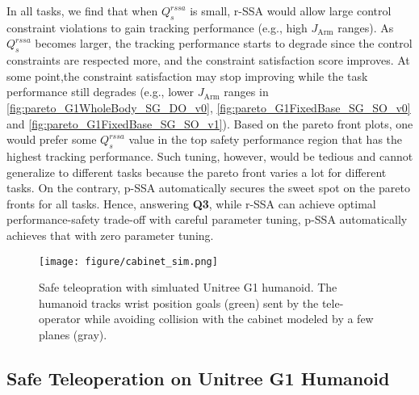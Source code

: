 In all tasks, we find that when $Q_s^{rssa}$ is small, r-SSA would allow large control constraint violations to gain tracking performance (e.g., high $J_\mathrm{Arm}$ ranges).
As $Q_s^{rssa}$ becomes larger, the tracking performance starts to degrade since the control constraints are respected more, and the constraint satisfaction score improves.
At some point,the constraint satisfaction may stop improving while the task performance still degrades (e.g., lower $J_\mathrm{Arm}$ ranges in \cref{fig:pareto_G1WholeBody_SG_DO_v0}, \cref{fig:pareto_G1FixedBase_SG_SO_v0} and \cref{fig:pareto_G1FixedBase_SG_SO_v1}).
Based on the pareto front plots, one would prefer some $Q_s^{rssa}$ value in the top safety performance region that has the highest tracking performance.
Such tuning, however, would be tedious and cannot generalize to different tasks because the pareto front varies a lot for different tasks.
On the contrary, p-SSA automatically secures the sweet spot on the pareto fronts for all tasks.
Hence, answering \textbf{Q3}, while r-SSA can achieve optimal performance-safety trade-off with careful parameter tuning, p-SSA automatically achieves that with zero parameter tuning.




\begin{figure*}[ht]
\centering
    \texttt{[image: figure/cabinet\_sim.png]}
    \caption{Safe teleopration with simluated Unitree G1 humanoid. The humanoid tracks wrist position goals (green) sent by the tele-operator while avoiding collision with the cabinet modeled by a few planes (gray). }
\label{fig: sim_g1_cabinet}
\end{figure*}

\subsection{Safe Teleoperation on Unitree G1 Humanoid}

